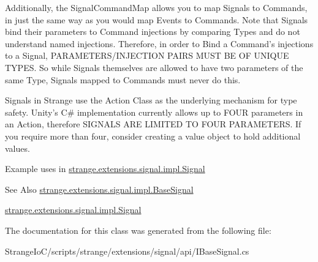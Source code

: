 Additionally, the Signal\-Command\-Map allows you to map Signals to Commands, in just the same way as you would map Events to Commands. Note that Signals bind their parameters to Command injections by comparing Types and do not understand named injections. Therefore, in order to Bind a Command's injections to a Signal, P\-A\-R\-A\-M\-E\-T\-E\-R\-S/\-I\-N\-J\-E\-C\-T\-I\-O\-N P\-A\-I\-R\-S M\-U\-S\-T B\-E O\-F U\-N\-I\-Q\-U\-E T\-Y\-P\-E\-S. So while Signals themselves are allowed to have two parameters of the same Type, Signals mapped to Commands must never do this.

Signals in Strange use the Action Class as the underlying mechanism for type safety. Unity's C\# implementation currently allows up to F\-O\-U\-R parameters in an Action, therefore S\-I\-G\-N\-A\-L\-S A\-R\-E L\-I\-M\-I\-T\-E\-D T\-O F\-O\-U\-R P\-A\-R\-A\-M\-E\-T\-E\-R\-S. If you require more than four, consider creating a value object to hold additional values.

Example uses in \hyperlink{classstrange_1_1extensions_1_1signal_1_1impl_1_1_signal}{strange.\-extensions.\-signal.\-impl.\-Signal}

\begin{DoxySeeAlso}{See Also}
\hyperlink{classstrange_1_1extensions_1_1signal_1_1impl_1_1_base_signal}{strange.\-extensions.\-signal.\-impl.\-Base\-Signal} 

\hyperlink{classstrange_1_1extensions_1_1signal_1_1impl_1_1_signal}{strange.\-extensions.\-signal.\-impl.\-Signal} 
\end{DoxySeeAlso}


The documentation for this class was generated from the following file\-:\begin{DoxyCompactItemize}
\item 
Strange\-Io\-C/scripts/strange/extensions/signal/api/I\-Base\-Signal.\-cs\end{DoxyCompactItemize}
